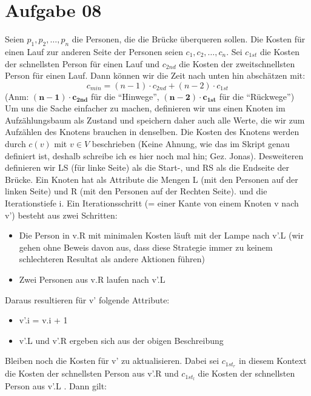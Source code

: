 \documentclass[10pt,a4paper]{article}
\begin{document}
    
\section*{Aufgabe 08}
    Seien ${p_1, p_2, \ldots, p_n}$ die Personen, die die Br\"ucke \"uberqueren
    sollen. Die Kosten f\"ur einen Lauf zur anderen Seite der Personen seien
    $c_1, c_2, \ldots, c_n$. Sei $c_{1st}$ die Kosten der schnellsten Person
    f\"ur einen Lauf und $c_{2nd}$ die Kosten der zweitschnellsten Person 
    f\"ur einen Lauf. Dann k\"onnen wir die Zeit nach unten hin absch\"atzen mit:
    $$
        c_{min} = (n-1) \cdot c_{2nd} + (n-2) \cdot c_{1st}
    $$
    (Anm: $\mathbf{(n-1) \cdot c_{2nd}}$ f\"ur die ``Hinwege'', 
    $\mathbf{(n-2) \cdot c_{1st}}$ f\"ur die ``R\"uckwege'') \\
    Um uns die Sache einfacher zu machen, definieren wir uns einen Knoten
    im Aufz\"ahlungsbaum als Zustand und speichern daher auch alle
    Werte, die wir zum Aufz\"ahlen des Knotens brauchen in denselben.
    Die Kosten des Knotens werden durch $c(v)$ mit $v \in V$ beschrieben
    (Keine Ahnung, wie das im Skript genau definiert ist, deshalb schreibe ich
    es hier noch mal hin; Gez. Jonas).
    Desweiteren definieren wir LS (f\"ur linke Seite) als die Start-, 
    und RS als die Endseite der Br\"ucke.
    Ein Knoten hat als Attribute die Mengen L (mit den Personen auf der
    linken Seite) und R (mit den Personen auf der Rechten Seite).
    und die Iterationstiefe i. Ein Iterationsschritt (= einer Kante von einem
    Knoten v nach v') besteht aus zwei Schritten:
    \begin{itemize}
        \item Die Person in v.R mit minimalen Kosten l\"auft mit der Lampe nach
              v'.L (wir gehen ohne Beweis davon aus, dass diese Strategie immer
              zu keinem schlechteren Resultat als andere Aktionen f\"uhren)
        \item Zwei Personen aus v.R laufen nach v'.L 
    \end{itemize}
    Daraus resultieren f\"ur v' folgende Attribute:
    \begin{itemize}
        \item v'.i = v.i + 1
        \item v'.L und v'.R ergeben sich aus der obigen Beschreibung
    \end{itemize}
    Bleiben noch die Kosten f\"ur v' zu aktualisieren. Dabei sei $c_{1st_r}$ in diesem
    Kontext die Kosten der schnellsten Person aus v'.R und $c_{1st_l}$ die Kosten
    der schnellsten Person aus v'.L . Dann gilt:
    
\end{document}

